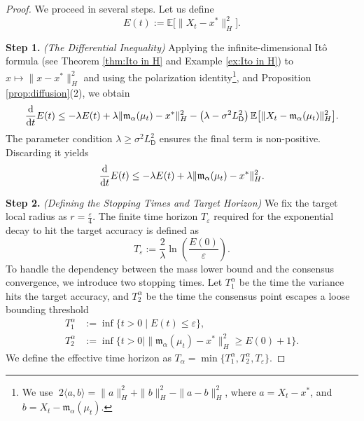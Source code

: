 \documentclass[12pt]{amsart}
\newcommand{\D}[1]{\mbox{\rm #1}}
\newcommand{\dd}{\D{d}}
\numberwithin{equation}{section}
\begin{document}
\begin{proof}
We proceed in several steps. 
Let us define 
\[
    E(t):= \mathbb{E}\big[\|X_t - x^*\|_H^2\big].
\]

\textbf{Step 1.} \textit{(The Differential Inequality)} 
Applying the infinite-dimensional It\^o formula (see Theorem \ref{thm:Ito in H} and Example \ref{ex:Ito in H}) to $x\mapsto \|x - x^*\|_H^2$ and using the polarization identity\footnote{We use $\;2\langle a,b\rangle = \|a\|_{H}^{2} + \|b\|_{H}^{2} - \|a-b\|_{H}^{2}$, where $a = X_t - x^{*}$, and $b = X_t - \mathfrak{m}_{\alpha}(\mu_t)$.}, and Proposition \ref{prop:diffusion}(2), we obtain 
\begin{equation*}
    \frac{\dd}{\dd t} E(t) \leq -\lambda E(t) + \lambda \|\mathfrak{m}_{\alpha}(\mu_t) - x^*\|_H^2 - \left( \lambda - \sigma^2 L_{\mathsf{D}}^2 \right) \mathbb{E}\big[\|X_t - \mathfrak{m}_{\alpha}(\mu_t)\|_H^2\big].
\end{equation*}
The parameter condition $\lambda \geq \sigma^2 L_{\mathsf{D}}^2$ ensures the final term is non-positive. Discarding it yields 
\begin{equation} \label{eq:diff_ineq_deg}
    \frac{\dd}{\dd t} E(t) \leq -\lambda E(t) + \lambda \|\mathfrak{m}_{\alpha}(\mu_t) - x^*\|_H^2.
\end{equation}

\textbf{Step 2.} \textit{(Defining the Stopping Times and Target Horizon)} 
We fix the target local radius as $r = \frac{\varepsilon}{4}$. The finite time horizon $T_\varepsilon$ required for the exponential decay to hit the target accuracy is defined as
\begin{equation*}
    T_\varepsilon := \frac{2}{\lambda} \ln \left( \frac{E(0)}{\varepsilon} \right).
\end{equation*}
To handle the dependency between the mass lower bound and the consensus convergence, we introduce two stopping times. Let $T^\alpha_1$ be the time the variance hits the target accuracy, and $T^\alpha_2$ be the time the consensus point escapes a loose bounding threshold
\begin{align*}
    T^\alpha_1 &:= \inf\big\{t > 0 \mid E(t) \leq \varepsilon \big\}, \\
    T^\alpha_2 &:= \inf\big\{t > 0 \mid \|\mathfrak{m}_{\alpha}(\mu_t) - x^*\|_H^2 \geq E(0) + 1 \big\}.
\end{align*}
We define the effective time horizon as $T_\alpha = \min\{T^\alpha_1, T^\alpha_2, T_\varepsilon\}$.


\end{proof}
\end{document}
